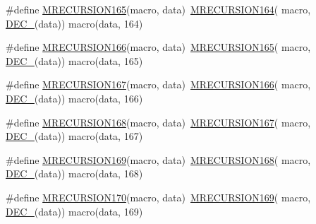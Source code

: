 \begin{DoxyCompactItemize}
\item 
\#define \mbox{\hyperlink{group__group__sam0__utils__mrecursion_ga66969ef41cc8bef39c450f9b204a99ce}{M\+R\+E\+C\+U\+R\+S\+I\+O\+N165}}(macro,  data)~\mbox{\hyperlink{group__group__sam0__utils__mrecursion_gaca0807249e00f403e7a8af24aae6e921}{M\+R\+E\+C\+U\+R\+S\+I\+O\+N164}}(  macro, \mbox{\hyperlink{group__group__sam0__utils__mrecursion_ga1d23d683797679dca8c3512a54a5dcae}{D\+E\+C\+\_\+}}(data))   macro(data, 164)
\item 
\#define \mbox{\hyperlink{group__group__sam0__utils__mrecursion_ga15ec150303a94ea66c95c878e13013c7}{M\+R\+E\+C\+U\+R\+S\+I\+O\+N166}}(macro,  data)~\mbox{\hyperlink{group__group__sam0__utils__mrecursion_ga66969ef41cc8bef39c450f9b204a99ce}{M\+R\+E\+C\+U\+R\+S\+I\+O\+N165}}(  macro, \mbox{\hyperlink{group__group__sam0__utils__mrecursion_ga1d23d683797679dca8c3512a54a5dcae}{D\+E\+C\+\_\+}}(data))   macro(data, 165)
\item 
\#define \mbox{\hyperlink{group__group__sam0__utils__mrecursion_ga82ff65a44b710e5d91c341035b18775c}{M\+R\+E\+C\+U\+R\+S\+I\+O\+N167}}(macro,  data)~\mbox{\hyperlink{group__group__sam0__utils__mrecursion_ga15ec150303a94ea66c95c878e13013c7}{M\+R\+E\+C\+U\+R\+S\+I\+O\+N166}}(  macro, \mbox{\hyperlink{group__group__sam0__utils__mrecursion_ga1d23d683797679dca8c3512a54a5dcae}{D\+E\+C\+\_\+}}(data))   macro(data, 166)
\item 
\#define \mbox{\hyperlink{group__group__sam0__utils__mrecursion_gadaf1ee758a9df8e9fc64e904b34ba008}{M\+R\+E\+C\+U\+R\+S\+I\+O\+N168}}(macro,  data)~\mbox{\hyperlink{group__group__sam0__utils__mrecursion_ga82ff65a44b710e5d91c341035b18775c}{M\+R\+E\+C\+U\+R\+S\+I\+O\+N167}}(  macro, \mbox{\hyperlink{group__group__sam0__utils__mrecursion_ga1d23d683797679dca8c3512a54a5dcae}{D\+E\+C\+\_\+}}(data))   macro(data, 167)
\item 
\#define \mbox{\hyperlink{group__group__sam0__utils__mrecursion_gaca0a21c7432f21cb2659932191c15b95}{M\+R\+E\+C\+U\+R\+S\+I\+O\+N169}}(macro,  data)~\mbox{\hyperlink{group__group__sam0__utils__mrecursion_gadaf1ee758a9df8e9fc64e904b34ba008}{M\+R\+E\+C\+U\+R\+S\+I\+O\+N168}}(  macro, \mbox{\hyperlink{group__group__sam0__utils__mrecursion_ga1d23d683797679dca8c3512a54a5dcae}{D\+E\+C\+\_\+}}(data))   macro(data, 168)
\item 
\#define \mbox{\hyperlink{group__group__sam0__utils__mrecursion_gaa0c6ffd6bc8a340f3acbbb7f8ec44e2e}{M\+R\+E\+C\+U\+R\+S\+I\+O\+N170}}(macro,  data)~\mbox{\hyperlink{group__group__sam0__utils__mrecursion_gaca0a21c7432f21cb2659932191c15b95}{M\+R\+E\+C\+U\+R\+S\+I\+O\+N169}}(  macro, \mbox{\hyperlink{group__group__sam0__utils__mrecursion_ga1d23d683797679dca8c3512a54a5dcae}{D\+E\+C\+\_\+}}(data))   macro(data, 169)

\end{DoxyCompactItemize}
